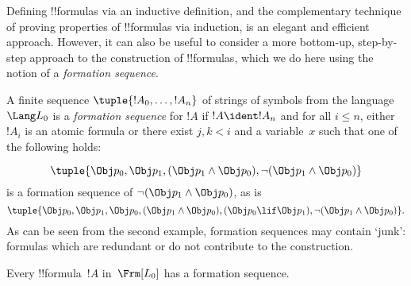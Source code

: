 \documentclass[../../../include/open-logic-section]{subfiles}
\begin{document}


Defining !!{formula}s via an inductive definition, and the
complementary technique of proving properties of !!{formula}s via
induction, is an elegant and efficient approach. However, it can
also be useful to consider a more bottom-up, step-by-step approach
to the construction of !!{formula}s, which we do here using the
notion of a \emph{formation sequence}.

\begin{defn}
A finite sequence $\tuple{!A_0,\dotsc,!A_n}$ of strings of
symbols from the language~$\Lang L_0$ is a \emph{formation
sequence} for $!A$ if $!A \ident !A_n$ and for all $i \leq n$,
either $!A_i$ is an atomic formula or there exist $j,k < i$ and
a variable~$x$ such that one of the following holds:
\begin{enumerate}
\end{enumerate}
\end{defn}

\begin{ex}
\[
\tuple{
    \Obj p_0,
    \Obj p_1,
    (\Obj p_1 \land \Obj p_0),
    \lnot (\Obj p_1 \land \Obj p_0)
}
\]
is a formation sequence of
$\lnot (\Obj p_1 \land \Obj p_0)$, as is
\[
\tuple{
    \Obj p_0,
    \Obj p_1,
    \Obj p_0,
    (\Obj p_1 \land \Obj p_0),
    (\Obj p_0 \lif \Obj p_1),
    \lnot (\Obj p_1 \land \Obj p_0)
}.
\]
%
As can be seen from the second example, formation sequences
may contain `junk': formulas which are redundant or do not
contribute to the construction.
\end{ex}

\begin{prop}
Every !!{formula}~$!A$ in~$\Frm[L_0]$ has a formation sequence.
\end{prop}
\end{document}

